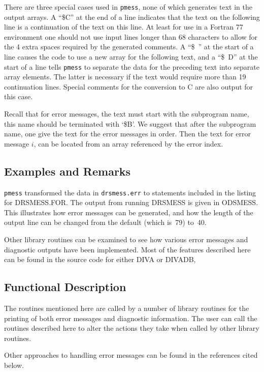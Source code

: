 \documentclass[twoside]{MATH77}
\begin{document}
There are three special cases used in {\tt pmess}, none of which generates
text in the output arrays.  A ``\$C'' at the end of a line indicates that the
text on the following line is a continuation of the text on this line.  At
least for use in a Fortran 77 environment one should not use input lines
longer than 68 characters to allow for the 4 extra spaces required by the
generated comments.  A ``\$~'' at the start of a line causes the code to use a
new array for the following text, and a ``\$~D'' at the start of a line tells
{\tt pmess} to separate the data for the preceding text into separate array
elements.  The latter is necessary if the text would require more than 19
continuation lines.  Special comments for the conversion to C are also output
for this case.

Recall that for error messages, the text must start with the subprogram
name, this name should be terminated with `\$B'.  We suggest that after
the subprogram name, one give the text for the error messages in order.
Then the text for error message $i$, can be located from an array
referenced by the error index.

\subsection{Examples and Remarks}

{\tt pmess} transformed the data in {\tt drsmess.err} to statements included in
the listing for DRSMESS.FOR. The output from running DRSMESS is given
in ODSMESS. This illustrates how error messages can be generated, and
how the length of the output line can be changed from the default
(which is~79) to~40.

Other library routines can be examined to see how various error
messages and diagnostic outputs have been implemented.  Most of the
features described here can be found in the source code for either
DIVA or DIVADB,

\subsection{Functional Description}

The routines mentioned here are called by a number of library routines for
the printing of both error messages and diagnostic information.  The
user can call the routines described here to alter the actions they
take when called by other library routines.

Other approaches to handling error messages can be found in the references
cited below.
\nocite{Fox:1978:PMS}
\nocite{Fox:1978:AFP}
\nocite{IMSL:1989:ML}
\nocite{Jones:1983:XER}
\end{document}
